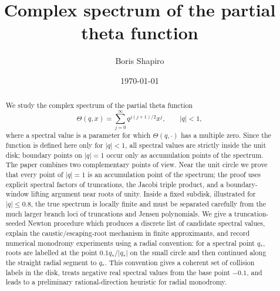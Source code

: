 \documentclass[11pt,a4paper,reqno]{amsart}
\title[Complex spectrum of the partial theta function]{Complex spectrum of the partial theta function}
\author{Boris Shapiro}
\date{\today}
\theoremstyle{remark}
\begin{document}
\begin{abstract}
We study the complex spectrum of the partial theta function
\[
        \Theta(q,x)=\sum_{j=0}^{\infty}q^{j(j+1)/2}x^j,
        \qquad |q|<1,
\]
where a spectral value is a parameter for which \(\Theta(q,\cdot)\) has a multiple zero.  Since the function is defined here only for \(|q|<1\), all spectral values are strictly inside the unit disk; boundary points on \(|q|=1\) occur only as accumulation points of the spectrum.  The paper combines two complementary points of view.  Near the unit circle we prove that every point of \(|q|=1\) is an accumulation point of the spectrum; the proof uses explicit spectral factors of truncations, the Jacobi triple product, and a boundary-window lifting argument near roots of unity.  Inside a fixed subdisk, illustrated for \(|q|\leq 0.8\), the true spectrum is locally finite and must be separated carefully from the much larger branch loci of truncations and Jensen polynomials.  We give a truncation-seeded Newton procedure which produces a discrete list of candidate spectral values, explain the caustic/escaping-root mechanism in finite approximants, and record numerical monodromy experiments using a radial convention: for a spectral point \(q_*\), roots are labelled at the point \(0.1q_*/|q_*|\) on the small circle and then continued along the straight radial segment to \(q_*\).  This convention gives a coherent set of collision labels in the disk, treats negative real spectral values from the base point \(-0.1\), and leads to a preliminary rational-direction heuristic for radial monodromy.
\end{abstract}
\maketitle
\end{document}
